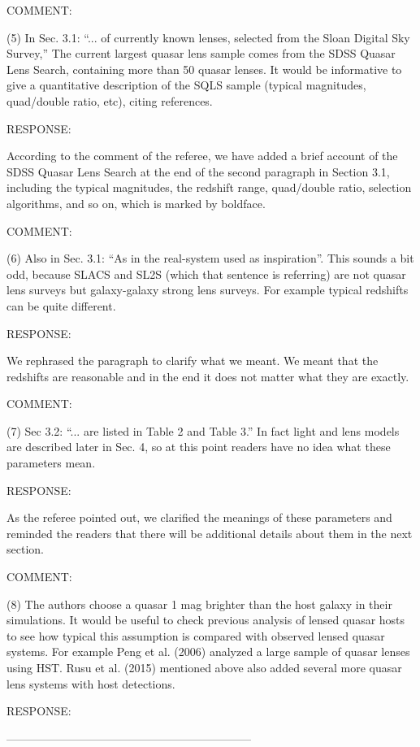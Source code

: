 \documentclass[a4paper,11pt]{article}
\begin{document}
COMMENT:

(5) In Sec. 3.1: ``... of currently known lenses, selected 
from the Sloan Digital Sky Survey,'' The current largest quasar lens sample 
comes from the SDSS Quasar Lens Search, containing more than 50 quasar lenses. 
It would be informative to give a quantitative description of the SQLS sample 
(typical magnitudes, quad/double ratio, etc), citing references.


RESPONSE:

According to the comment of the referee, we have added 
a brief account of the SDSS Quasar Lens Search 
at the end of the second paragraph in Section 3.1, 
including the typical magnitudes, the redshift range, quad/double ratio, 
selection algorithms, and so on, which is marked by boldface.

COMMENT:

(6) Also in Sec. 3.1: ``As in the real-system used as inspiration''. 
This sounds a bit odd, because SLACS and SL2S (which that sentence is referring) 
are not quasar lens surveys but galaxy-galaxy strong lens surveys. 
For example typical redshifts can be quite different.


RESPONSE:

We rephrased the paragraph to clarify what we meant. We meant that the
redshifts are reasonable and in the end it does not matter what they
are exactly.


COMMENT:

(7) Sec 3.2: ``... are listed in Table 2 and Table 3.'' In fact light and lens models 
are described later in Sec. 4, so at this point readers have no idea what these parameters mean.


RESPONSE:

As the referee pointed out, we clarified the meanings of these parameters 
and reminded the readers that there will be additional details about them 
in the next section.


COMMENT:

(8) The authors choose a quasar 1 mag brighter than the host galaxy in their simulations. It would be useful to check previous analysis of lensed quasar hosts to see how typical this assumption is compared with observed lensed quasar systems. For example Peng et al. (2006) analyzed a large sample of quasar lenses using HST. Rusu et al. (2015) mentioned above also added several more quasar lens systems with host detections.


RESPONSE:


-----------------------------------------------------------------
\end{document}
